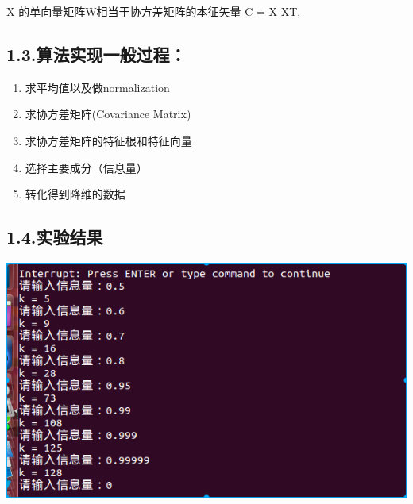 \documentclass[a4paper, 12pt]{ctexart}
\begin{document}
\noindent{}X 的单向量矩阵W相当于协方差矩阵的本征矢量 C = X XT,








\subsection{1.3.\hspace*{0.5em}算法实现一般过程：}\label{section}%

\begin{enumerate}[noitemsep,topsep=\mdcompacttopsep]%

\item{}求平均值以及做normalization%

\item{}求协方差矩阵(Covariance Matrix)%

\item{}求协方差矩阵的特征根和特征向量%

\item{}选择主要成分（信息量）%

\item{}转化得到降维的数据%
\end{enumerate}%

\subsection{1.4.\hspace*{0.5em}实验结果}\label{section}%

\noindent{}\includegraphics[keepaspectratio=true,width=\dimmin{}{\dimwidth{0.90}}]{images/PCA}{}%
\end{document}
